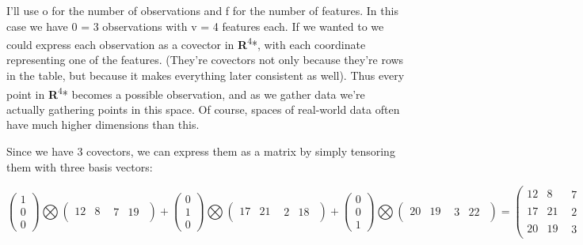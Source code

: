 \documentclass[oneside,english]{amsbook}
\numberwithin{section}{chapter}
\theoremstyle{plain}
\theoremstyle{definition}
\begin{document}
I'll use o for the number of observations and f for the number of
features. In this case we have 0 = 3 observations with v = 4 features
each. If we wanted to we could express each observation as a covector in
\textbf{R}\textsuperscript{4}*, with each coordinate representing one of
the features. (They're covectors not only because they're rows in the
table, but because it makes everything later consistent as well). Thus
every point in \textbf{R}\textsuperscript{4}* becomes a possible
observation, and as we gather data we're actually gathering points in
this space. Of course, spaces of real-world data often have much higher
dimensions than this.

Since we have 3 covectors, we can express them as a matrix by simply
tensoring them with three basis vectors:

\[\begin{pmatrix}
	1 \\
	0 \\
	0
\end{pmatrix}\bigotimes\begin{pmatrix}
	12 & 8 & \begin{matrix}
		7 & 19
	\end{matrix}
\end{pmatrix} + \begin{pmatrix}
	0 \\
	1 \\
	0
\end{pmatrix}\bigotimes\begin{pmatrix}
	17 & 21 & \begin{matrix}
		2 & 18
	\end{matrix}
\end{pmatrix} + \begin{pmatrix}
	0 \\
	0 \\
	1
\end{pmatrix}\bigotimes\begin{pmatrix}
	20 & 19 & \begin{matrix}
		3 & 22
	\end{matrix}
\end{pmatrix} = \begin{pmatrix}
	12 & 8 & \begin{matrix}
		7 & 19
	\end{matrix} \\
	17 & 21 & \begin{matrix}
		2 & 18
	\end{matrix} \\
	20 & 19 & \begin{matrix}
		3 & 22
	\end{matrix}
\end{pmatrix}\]
\end{document}
